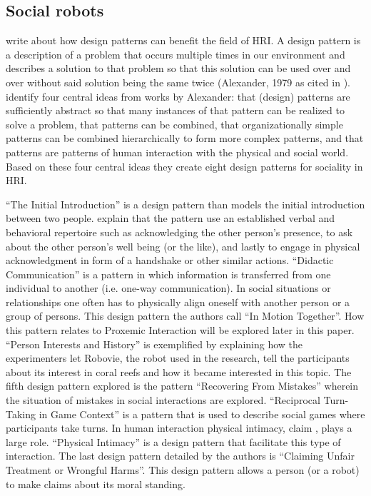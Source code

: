 \subsection{Social robots}

\textcite{Kahn2008robot} write about how design patterns can benefit the field of HRI. A design pattern is a description of a problem that occurs multiple times in our environment and describes a solution to that problem so that this solution can be used over and over without said solution being the same twice (Alexander, 1979 as cited in \cite{Kahn2008robot}). \textcite{Kahn2008robot} identify four central ideas from works by Alexander: that (design) patterns are sufficiently abstract so that many instances of that pattern can be realized to solve a problem, that patterns can be combined, that organizationally simple patterns can be combined hierarchically to form more complex patterns, and that patterns are patterns of human interaction with the physical and social world. Based on these four central ideas they create eight design patterns for sociality in HRI.

``The Initial Introduction'' is a design pattern than models the initial introduction between two people. \textcite{Kahn2008robot} explain that the pattern use an established verbal and behavioral repertoire such as acknowledging the other person's presence, to ask about the other person's well being (or the like), and lastly to engage in physical acknowledgment in form of a handshake or other similar actions. ``Didactic Communication'' is a pattern in which information is transferred from one individual to another (i.e. one-way communication). In social situations or relationships one often has to physically align oneself with another person or a group of persons. This design pattern the authors call ``In Motion Together''. How this pattern relates to Proxemic Interaction will be explored later in this paper. ``Person Interests  and History'' is exemplified by explaining how the experimenters let Robovie, the robot used in the research, tell the participants about its interest in coral reefs and how it became interested in this topic. The fifth design pattern explored is the pattern ``Recovering From Mistakes'' wherein the situation of mistakes in social interactions are explored. ``Reciprocal Turn-Taking in Game Context'' is a pattern that is used to describe social games where participants take turns. In human interaction physical intimacy, claim \textcite{Kahn2008robot}, plays a large role. ``Physical Intimacy'' is a design pattern that facilitate this type of interaction. The last design pattern detailed by the authors is ``Claiming Unfair Treatment or Wrongful Harms''. This design pattern allows a person (or a robot) to make claims about its moral standing.

